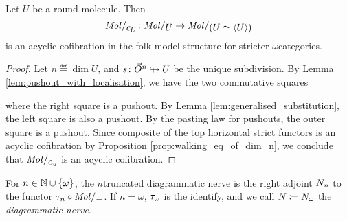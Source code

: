\begin{prop} \label{prop:molecin_send_Jcomp_to_acof}
    Let \( U \) be a round molecule.
    Then
    \begin{equation*}
        \molecin{c_U} \colon \molecin{U} \to \molecin{(U \simeq \compos{U})}
    \end{equation*}
    is an acyclic cofibration in the folk model structure for stricter \( \omega \)\nbd categories.
\end{prop}
\begin{proof}
    Let \( n \eqdef \dim U \), and \( s \colon \vec{O}^{n} \looparrowright U \) be the unique subdivision.
    By Lemma \ref{lem:pushout_with_localisation}, we have the two commutative squares
    \begin{center}
    \end{center}
    where the right square is a pushout.
    By Lemma \ref{lem:generalised_substitution}, the left square is also a pushout.
    By the pasting law for pushouts, the outer square is a pushout.
    Since composite of the top horizontal strict functors is an acyclic cofibration by Proposition \ref{prop:walking_eq_of_dim_n}, we conclude that \( \molecin{c_u} \) is an acyclic cofibration.
\end{proof}


\begin{dfn} 
    For \( n \in \mathbb{N} \cup \left\{ {\omega} \right\} \), the \( n \)\nbd truncated diagrammatic nerve is the right adjoint \( N_{n} \) to the functor \( \trunc{n} \after \molecin{-} \).
    If \( n = \omega \), \( \tau_{\omega} \) is the identify, and we call \( N_{} \coloneqq N_{\omega} \) the \emph{diagrammatic nerve}.
\end{dfn}


